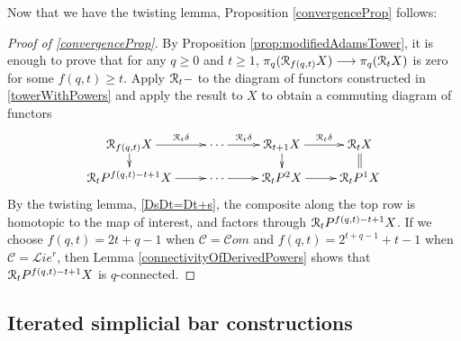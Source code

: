 \documentclass[11pt]{amsart} \renewcommand{\baselinestretch}{1.4}
\theoremstyle{plain}
\theoremstyle{definition}
\newcommand{\DASH}{\mathrm{-}}
\renewcommand{\to}{\longrightarrow}
\newcommand{\scrL}{\mathscr{L}}
\newcommand{\scrC}{\mathscr{C}}
\newcommand{\calR}{\mathcal{R}}
\newcommand{\calc}{\mathcal{C}}
\newcommand{\algs}{{\scrC\!\textit{om}}}
\newcommand{\restliealgs}{{\scrL\!\textit{ie}^\textit{r}}}
\newcommand{\algcat}{{\calc}}%
\newcommand{\caldup}[1]{\calR_{\smash{#1}}}
\begin{document}
\begin{Bousfield-Kan spectral sequence}
Now that we have the twisting lemma, Proposition \ref{convergenceProp} follows:
\begin{proof}[Proof of \ref{convergenceProp}]
By Proposition \ref{prop:modifiedAdamsTower}, it is enough to prove that for any $q\geq0$ and $t\geq1$, $\pi_q(\caldup{f(q,t)}X)\to\pi_q(\caldup{t}X)$ is zero for some $f(q,t)\geq t$.
Apply $\caldup{t}\DASH$ to the diagram of functors constructed in \ref{towerWithPowers} and apply the result to $X$ to obtain a commuting diagram of functors
\[\xymatrix@R=4mm{
\caldup{f(q,t)}X
\ar[r]^-{\caldup{t}\delta}
\ar[d]
&
\cdots \ar[r]^-{\caldup{t}\delta}
&%
\caldup{t+1}X
\ar[r]^-{\caldup{t}\delta}
\ar[d]&%
\caldup{t}X
\ar@{=}[d]
\\%
\caldup{t}P^{f(q,t)-t+1}X
\ar[r]
&%
\cdots 
\ar[r]&%
\caldup{t}P^2X
\ar[r]
&%
\caldup{t}P^1X%
}\]
By the twisting lemma, \ref{DsDt=Dt+s}, the composite along the top row is homotopic to the map of interest, and factors through $\caldup{t}P^{f(q,t)-t+1}X$. If we choose $f(q,t)=2t+q-1$ when $\algcat=\algs$ and $f(q,t)=2^{t+q-1}+t-1$ when $\algcat=\restliealgs$, then Lemma \ref{connectivityOfDerivedPowers} shows that $\caldup{t}P^{f(q,t)-t+1}X$  is $q$-connected.
\end{proof}

\subsection{Iterated simplicial bar constructions}\label{sec:ItSimpBar}



\end{Bousfield-Kan spectral sequence}
\end{document}
